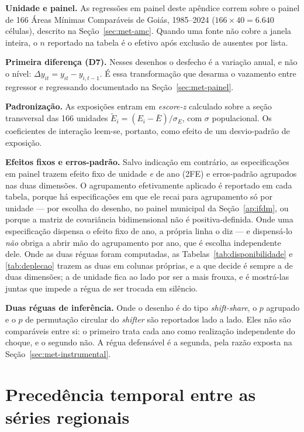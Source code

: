 \textbf{Unidade e painel.} As regressões em painel deste apêndice correm sobre
o painel de 166 Áreas Mínimas Comparáveis de Goiás, 1985--2024 (\(166 \times 40
= 6.640\) células), descrito na Seção~\ref{sec:met-amc}. Quando uma fonte não
cobre a janela inteira, o \(n\) reportado na tabela é o efetivo após exclusão de
ausentes por lista.

\textbf{Primeira diferença (D7).} Nesses desenhos o desfecho é a variação
anual, e não o nível: \(\Delta y_{it} = y_{it} - y_{i,t-1}\). É essa
transformação que desarma o vazamento entre regressor e regressando documentado
na Seção~\ref{sec:met-painel}.

\textbf{Padronização.} As exposições entram em \emph{escore-z} calculado sobre
a seção transversal das 166 unidades \(\tilde{E}_i = (E_i - \bar{E})/\sigma_E\),
com \(\sigma\) populacional. Os coeficientes de interação leem-se, portanto,
como efeito de um desvio-padrão de exposição.

\textbf{Efeitos fixos e erros-padrão.} Salvo indicação em contrário, as
especificações em painel trazem efeito fixo de unidade \emph{e} de ano (2FE) e
erros-padrão agrupados nas duas dimensões. O agrupamento efetivamente aplicado
é reportado em cada tabela, porque há especificações em que ele recai para
agrupamento só por unidade --- por escolha do desenho, no painel municipal da
Seção~\ref{ap:ifdm}, ou porque a matriz de covariância bidimensional não é
positiva-definida. Onde uma especificação dispensa o efeito fixo de ano, a
própria linha o diz --- e dispensá-lo \emph{não} obriga a abrir mão do
agrupamento por ano, que é escolha independente dele. Onde as duas réguas
foram computadas, as Tabelas~\ref{tab:disponibilidade} e \ref{tab:deplecao}
trazem as duas em colunas próprias, e a que decide é sempre a de duas
dimensões; a de unidade fica ao lado por ser a mais frouxa, e é mostrá-las
juntas que impede a régua de ser trocada em silêncio.

\textbf{Duas réguas de inferência.} Onde o desenho é do tipo
\emph{shift-share}, o \(p\) agrupado e o \(p\) de permutação circular do
\emph{shifter} são reportados lado a lado. Eles não são comparáveis entre si: o
primeiro trata cada ano como realização independente do choque, e o segundo
não. A régua defensável é a segunda, pela razão exposta na
Seção~\ref{sec:met-instrumental}.


\FloatBarrier

\section{Precedência temporal entre as séries regionais}
\label{ap:precedencia}

